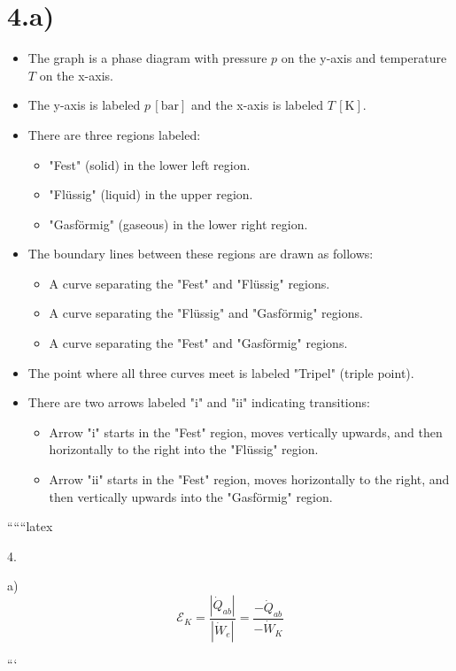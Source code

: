 \section*{4.a)}

\begin{itemize}
    \item The graph is a phase diagram with pressure \( p \) on the y-axis and temperature \( T \) on the x-axis.
    \item The y-axis is labeled \( p \, [\text{bar}] \) and the x-axis is labeled \( T \, [\text{K}] \).
    \item There are three regions labeled:
    \begin{itemize}
        \item "Fest" (solid) in the lower left region.
        \item "Flüssig" (liquid) in the upper region.
        \item "Gasförmig" (gaseous) in the lower right region.
    \end{itemize}
    \item The boundary lines between these regions are drawn as follows:
    \begin{itemize}
        \item A curve separating the "Fest" and "Flüssig" regions.
        \item A curve separating the "Flüssig" and "Gasförmig" regions.
        \item A curve separating the "Fest" and "Gasförmig" regions.
    \end{itemize}
    \item The point where all three curves meet is labeled "Tripel" (triple point).
    \item There are two arrows labeled "i" and "ii" indicating transitions:
    \begin{itemize}
        \item Arrow "i" starts in the "Fest" region, moves vertically upwards, and then horizontally to the right into the "Flüssig" region.
        \item Arrow "ii" starts in the "Fest" region, moves horizontally to the right, and then vertically upwards into the "Gasförmig" region.
    \end{itemize}
\end{itemize}

``````latex


4.

a) \\
\[
\mathcal{E}_K = \frac{|\dot{Q}_{ab}|}{|\dot{W}_e|} = \frac{-\dot{Q}_{ab}}{-\dot{W}_K}
\]

```